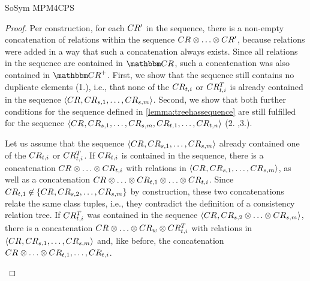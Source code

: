 \begin{copiedFrom}{SoSym MPM4CPS}
\begin{proof}
    Per construction, for each $CR'_{}$ in the sequence, there is a non-empty concatenation of relations within the sequence $\consistencyrelation{CR}{} \concat \dots \concat \consistencyrelation{CR'}{}$, because relations were added in a way that such a concatenation always exists. Since all relations in the sequence are contained in $\consistencyrelationset{CR}$, such a concatenation was also contained in $\transitiveclosure{\consistencyrelationset{CR}}$.
    First, we show that the sequence still contains no duplicate elements (1.), i.e., that none of the $CR_{t,i}$ or $CR^T_{t,i}$ is already contained in the sequence $\langle CR_{}, CR_{s,1}, \dots, CR_{s,m} \rangle$. 
    Second, we show that both further conditions for the sequence defined in \autoref{lemma:treehassequence} are still fulfilled for the sequence $\langle CR_{}, CR_{s,1}, \dots, CR_{s,m}, CR_{t,1}, \dots, CR_{t,n} \rangle$ (2. ,3.).
    \begin{properenumerate}
        \item
    Let us assume that the sequence $\langle CR_{}, CR_{s,1}, \dots, CR_{s,m} \rangle$ already contained one of the $CR_{t,i}$ or $CR^T_{t,i}$. If $CR_{t,i}$ is contained in the sequence, there is a concatenation $\consistencyrelation{CR}{} \concat \dots \concat \consistencyrelation{CR}{t,i}$ with relations in $\langle CR_{}, CR_{s,1}, \dots, CR_{s,m} \rangle$, as well as a concatenation $\consistencyrelation{CR}{} \concat \dots \concat \consistencyrelation{CR}{t,1} \concat \dots \concat \consistencyrelation{CR}{t,i}$.
    Since $CR_{t,1} \not\in \{ CR_{}, CR_{s,2}, \dots, CR_{s,m} \}$ by construction, these two concatenations relate the same class tuples, i.e., they contradict the definition of a consistency relation tree.
    If $CR^T_{t,i}$ was contained in the sequence $\tupled{\consistencyrelation{CR}{}, \consistencyrelation{CR}{s,2} \concat \dots \concat \consistencyrelation{CR}{s,m}}$, there is a concatenation $\consistencyrelation{CR}{} \concat \dots \concat \consistencyrelation{CR}{w} \concat \consistencyrelation{CR^T}{t,i}$ with relations in $\langle CR_{}, CR_{s,1}, \dots, CR_{s,m} \rangle$ and, like before, the concatenation $\consistencyrelation{CR}{} \concat \dots \concat \consistencyrelation{CR}{t,1}, \dots, \consistencyrelation{CR}{t,i}$.

\end{properenumerate}
\end{proof}
\end{copiedFrom}
